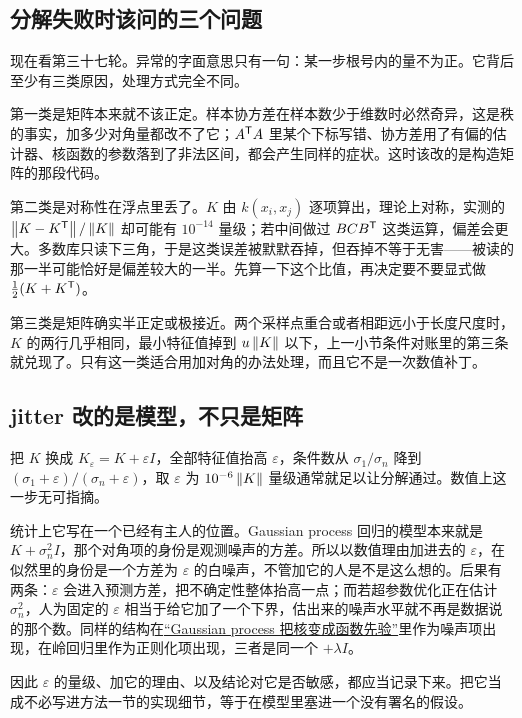 \subsection{分解失败时该问的三个问题}

现在看第三十七轮。异常的字面意思只有一句：某一步根号内的量不为正。它背后至少有三类原因，处理方式完全不同。

第一类是矩阵本来就不该正定。样本协方差在样本数少于维数时必然奇异，这是秩的事实，加多少对角量都改不了它；\(A^{\mathsf{T}}A\) 里某个下标写错、协方差用了有偏的估计器、核函数的参数落到了非法区间，都会产生同样的症状。这时该改的是构造矩阵的那段代码。

第二类是对称性在浮点里丢了。\(K\) 由 \(k(x_i,x_j)\) 逐项算出，理论上对称，实测的 \(\left\lVert K-K^{\mathsf{T}}\right\rVert/\left\lVert K\right\rVert\) 却可能有 \(10^{-14}\) 量级；若中间做过 \(BCB^{\mathsf{T}}\) 这类运算，偏差会更大。多数库只读下三角，于是这类误差被默默吞掉，但吞掉不等于无害——被读的那一半可能恰好是偏差较大的一半。先算一下这个比值，再决定要不要显式做 \(\tfrac12(K+K^{\mathsf{T}})\)。

第三类是矩阵确实半正定或极接近。两个采样点重合或者相距远小于长度尺度时，\(K\) 的两行几乎相同，最小特征值掉到 \(u\left\lVert K\right\rVert\) 以下，上一小节条件对账里的第三条就兑现了。只有这一类适合用加对角的办法处理，而且它不是一次数值补丁。

\subsection{jitter 改的是模型，不只是矩阵}

把 \(K\) 换成 \(K_\varepsilon=K+\varepsilon I\)，全部特征值抬高 \(\varepsilon\)，条件数从 \(\sigma_1/\sigma_n\) 降到 \((\sigma_1+\varepsilon)/(\sigma_n+\varepsilon)\)，取 \(\varepsilon\) 为 \(10^{-6}\left\lVert K\right\rVert\) 量级通常就足以让分解通过。数值上这一步无可指摘。

统计上它写在一个已经有主人的位置。Gaussian process 回归的模型本来就是 \(K+\sigma_n^2I\)，那个对角项的身份是观测噪声的方差。所以以数值理由加进去的 \(\varepsilon\)，在似然里的身份是一个方差为 \(\varepsilon\) 的白噪声，不管加它的人是不是这么想的。后果有两条：\(\varepsilon\) 会进入预测方差，把不确定性整体抬高一点；而若超参数优化正在估计 \(\sigma_n^2\)，人为固定的 \(\varepsilon\) 相当于给它加了一个下界，估出来的噪声水平就不再是数据说的那个数。同样的结构在\hyperref[sec:13-Machine-Learning/09-Kernel-Methods-and-Gaussian-Processes/05]{``Gaussian process 把核变成函数先验''}里作为噪声项出现，在岭回归里作为正则化项出现，三者是同一个 \(+\lambda I\)。

因此 \(\varepsilon\) 的量级、加它的理由、以及结论对它是否敏感，都应当记录下来。把它当成不必写进方法一节的实现细节，等于在模型里塞进一个没有署名的假设。

